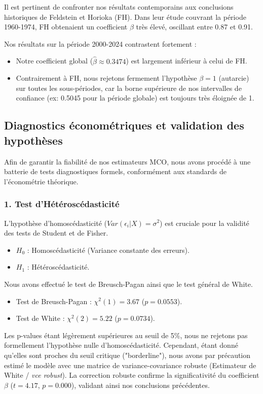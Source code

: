 \documentclass[12pt, a4paper]{article}
\begin{document}
Il est pertinent de confronter nos résultats contemporains aux conclusions historiques de Feldstein et Horioka (FH).
Dans leur étude couvrant la période 1960-1974, FH obtenaient un coefficient $\beta$ très élevé, oscillant entre 0.87 et 0.91.

Nos résultats sur la période 2000-2024 contrastent fortement :
\begin{itemize}
    \item Notre coefficient global ($\hat{\beta} \approx 0.3474$) est largement inférieur à celui de FH.
    \item Contrairement à FH, nous rejetons fermement l'hypothèse $\beta=1$ (autarcie) sur toutes les sous-périodes, car la borne supérieure de nos intervalles de confiance (ex: 0.5045 pour la période globale) est toujours très éloignée de 1.
\end{itemize}
\subsection{Diagnostics économétriques et validation des hypothèses}

Afin de garantir la fiabilité de nos estimateurs MCO, nous avons procédé à une batterie de tests diagnostiques formels, conformément aux standards de l'économétrie théorique.

\subsubsection*{1. Test d'Hétéroscédasticité}
L'hypothèse d'homoscédasticité ($Var(\epsilon_i|X) = \sigma^2$) est cruciale pour la validité des tests de Student et de Fisher.
\begin{itemize}
    \item $H_0$ : Homoscédasticité (Variance constante des erreurs).
    \item $H_1$ : Hétéroscédasticité.
\end{itemize}
Nous avons effectué le test de Breusch-Pagan ainsi que le test général de White.
\begin{itemize}
    \item Test de Breusch-Pagan : $\chi^2(1) = 3.67$ ($p = 0.0553$).
    \item Test de White : $\chi^2(2) = 5.22$ ($p = 0.0734$).
\end{itemize}
Les p-values étant légèrement supérieures au seuil de 5\%, nous ne rejetons pas formellement l'hypothèse nulle d'homoscédasticité. Cependant, étant donné qu'elles sont proches du seuil critique ("borderline"), nous avons par précaution estimé le modèle avec une matrice de variance-covariance robuste (Estimateur de White / \textit{vce robust}). La correction robuste confirme la significativité du coefficient $\beta$ ($t=4.17$, $p=0.000$), validant ainsi nos conclusions précédentes.
\end{document}
